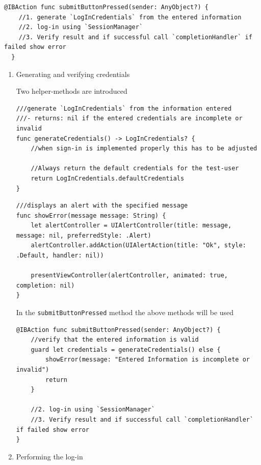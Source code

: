 \documentclass{article}
\begin{document}
\begin{verbatim}
@IBAction func submitButtonPressed(sender: AnyObject?) {
    //1. generate `LogInCredentials` from the entered information
    //2. log-in using `SessionManager`
    //3. Verify result and if successful call `completionHandler` if failed show error
  }
\end{verbatim}
\begin{enumerate}
\item{Generating and verifying credentials}\label{generating-and-verifying-credentials}

Two helper-methods are introduced

\begin{verbatim}
///generate `LogInCredentials` from the information entered
///- returns: nil if the entered credentials are incomplete or invalid
func generateCredentials() -> LogInCredentials? {
    //when sign-in is implemented properly this has to be adjusted

    //Always return the default credentials for the test-user
    return LogInCredentials.defaultCredentials
}
\end{verbatim}

\begin{verbatim}
///displays an alert with the specified message
func showError(message message: String) {
    let alertController = UIAlertController(title: message, message: nil, preferredStyle: .Alert)
    alertController.addAction(UIAlertAction(title: "Ok", style: .Default, handler: nil))

    presentViewController(alertController, animated: true, completion: nil)
}
\end{verbatim}

In the \texttt{submitButtonPressed} method the above methods will be
used

\begin{verbatim}
@IBAction func submitButtonPressed(sender: AnyObject?) {
    //verify that the entered information is valid
    guard let credentials = generateCredentials() else {
        showError(message: "Entered Information is incomplete or invalid")
        return
    }

    //2. log-in using `SessionManager`
    //3. Verify result and if successful call `completionHandler` if failed show error
}
\end{verbatim}

\item{Performing the log-in}\label{performing-the-log-in}


\end{enumerate}
\end{document}
